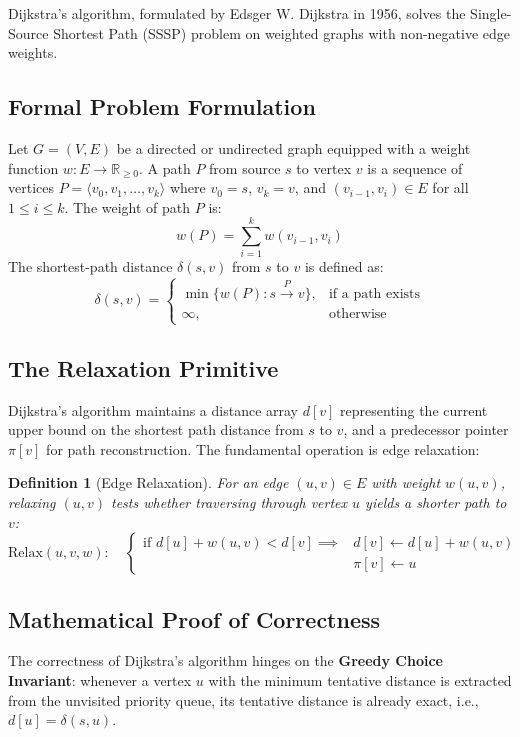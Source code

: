\documentclass[10pt,journal,compsoc,onecolumn]{IEEEtran}
\newtheorem{definition}[theorem]{Definition}
\begin{document}
Dijkstra's algorithm, formulated by Edsger W. Dijkstra in 1956, solves the Single-Source Shortest Path (SSSP) problem on weighted graphs with non-negative edge weights.

\subsection{Formal Problem Formulation}
Let $G = (V, E)$ be a directed or undirected graph equipped with a weight function $w: E \to \mathbb{R}_{\ge 0}$. A path $P$ from source $s$ to vertex $v$ is a sequence of vertices $P = \langle v_0, v_1, \dots, v_k \rangle$ where $v_0 = s$, $v_k = v$, and $(v_{i-1}, v_i) \in E$ for all $1 \le i \le k$. The weight of path $P$ is:
\begin{equation}
w(P) = \sum_{i=1}^k w(v_{i-1}, v_i)
\end{equation}
The shortest-path distance $\delta(s, v)$ from $s$ to $v$ is defined as:
\begin{equation}
\delta(s, v) = \begin{cases} 
\min \{ w(P) : s \xrightarrow{P} v \}, & \text{if a path exists} \\
\infty, & \text{otherwise}
\end{cases}
\end{equation}

\subsection{The Relaxation Primitive}
Dijkstra's algorithm maintains a distance array $d[v]$ representing the current upper bound on the shortest path distance from $s$ to $v$, and a predecessor pointer $\pi[v]$ for path reconstruction. The fundamental operation is edge relaxation:

\begin{definition}[Edge Relaxation]
For an edge $(u, v) \in E$ with weight $w(u, v)$, relaxing $(u, v)$ tests whether traversing through vertex $u$ yields a shorter path to $v$:
\begin{equation}
\text{Relax}(u, v, w): \quad \begin{cases}
\text{if } d[u] + w(u, v) < d[v] \implies & d[v] \leftarrow d[u] + w(u, v) \\
& \pi[v] \leftarrow u
\end{cases}
\end{equation}
\end{definition}

\subsection{Mathematical Proof of Correctness}
The correctness of Dijkstra's algorithm hinges on the \textbf{Greedy Choice Invariant}: whenever a vertex $u$ with the minimum tentative distance is extracted from the unvisited priority queue, its tentative distance is already exact, i.e., $d[u] = \delta(s, u)$.
\end{document}
